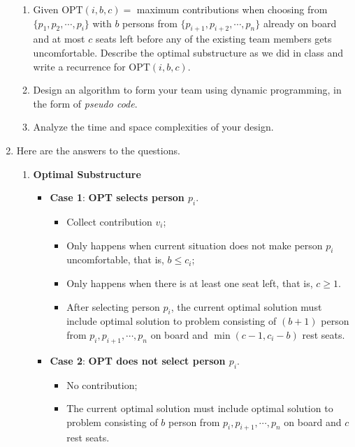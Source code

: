 \documentclass[12pt,a4paper]{article}
\makeatletter
\newtheorem*{solution}{Solution}
\theoremstyle{definition}
\renewenvironment{solution}[1][Solution] {\par\pushQED{\qed}\normalfont\topsep6\p@\@plus6\p@\relax\trivlist\item[\hskip\labelsep\bfseries#1\@addpunct{.}]\ignorespaces}{\popQED\endtrivlist\@endpefalse} \makeatother
\makeatother
\begin{document}
\begin{enumerate}
	\begin{enumerate}
		\item Given $\text{OPT}(i, b, c)=$ maximum contributions when choosing from $\{p_1, p_2, \cdots, p_i\}$ with $b$ persons from $\{p_{i+1}, p_{i+2}, \cdots, p_n\}$ already on board and at most $c$ seats left before any of the existing team members gets uncomfortable. Describe the optimal substructure as we did in class and write a recurrence for $\text{OPT}(i, b, c)$.
		\item Design an algorithm to form your team using dynamic programming, in the form of \emph{pseudo code}.
        \item Analyze the time and space complexities of your design.
	\end{enumerate}
    \begin{solution} Here are the answers to the questions.
    \begin{enumerate}
    \item \textbf{Optimal Substructure}
        \begin{itemize}
        \item \textbf{\color{blue}Case 1}: \textbf{OPT selects person $p_i$}.
            \begin{itemize}
                \item Collect contribution $v_i$;
                \item Only happens when current situation does not make person $p_i$ uncomfortable, that is, $b \leq c_i$;
                \item Only happens when there is at least one seat left, that is, $c \geq 1$.
                \item After selecting person $p_i$, the current optimal solution must include optimal solution to problem consisting of $(b+1)$ person from $p_i, p_{i+1},\cdots,p_n$ on board and $\min(c-1,c_i-b)$ rest seats.
            \end{itemize}
        \item \textbf{\color{blue}Case 2}: \textbf{OPT does not select person $p_i$}.
            \begin{itemize}
                \item No contribution;
                \item The current optimal solution must include optimal solution to problem consisting of $b$ person from $p_i, p_{i+1},\cdots,p_n$ on board and $c$ rest seats.
            \end{itemize}
        \end{itemize}

\end{enumerate}
\end{solution}
\end{enumerate}
\end{document}
